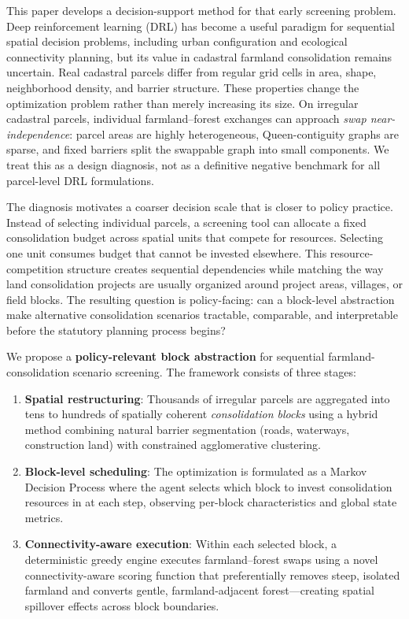 \documentclass[preprint,12pt]{elsarticle}
\begin{document}
This paper develops a decision-support method for that early screening problem. Deep reinforcement learning (DRL) has become a useful paradigm for sequential spatial decision problems, including urban configuration and ecological connectivity planning, but its value in cadastral farmland consolidation remains uncertain. Real cadastral parcels differ from regular grid cells in area, shape, neighborhood density, and barrier structure. These properties change the optimization problem rather than merely increasing its size. On irregular cadastral parcels, individual farmland--forest exchanges can approach \textit{swap near-independence}: parcel areas are highly heterogeneous, Queen-contiguity graphs are sparse, and fixed barriers split the swappable graph into small components. We treat this as a design diagnosis, not as a definitive negative benchmark for all parcel-level DRL formulations.

The diagnosis motivates a coarser decision scale that is closer to policy practice. Instead of selecting individual parcels, a screening tool can allocate a fixed consolidation budget across spatial units that compete for resources. Selecting one unit consumes budget that cannot be invested elsewhere. This resource-competition structure creates sequential dependencies while matching the way land consolidation projects are usually organized around project areas, villages, or field blocks. The resulting question is policy-facing: can a block-level abstraction make alternative consolidation scenarios tractable, comparable, and interpretable before the statutory planning process begins?

We propose a \textbf{policy-relevant block abstraction} for sequential farmland-consolidation scenario screening. The framework consists of three stages:

\begin{enumerate}
\item \textbf{Spatial restructuring}: Thousands of irregular parcels are aggregated into tens to hundreds of spatially coherent \textit{consolidation blocks} using a hybrid method combining natural barrier segmentation (roads, waterways, construction land) with constrained agglomerative clustering.

\item \textbf{Block-level scheduling}: The optimization is formulated as a Markov Decision Process where the agent selects which block to invest consolidation resources in at each step, observing per-block characteristics and global state metrics.

\item \textbf{Connectivity-aware execution}: Within each selected block, a deterministic greedy engine executes farmland--forest swaps using a novel connectivity-aware scoring function that preferentially removes steep, isolated farmland and converts gentle, farmland-adjacent forest---creating spatial spillover effects across block boundaries.
\end{enumerate}
\end{document}
